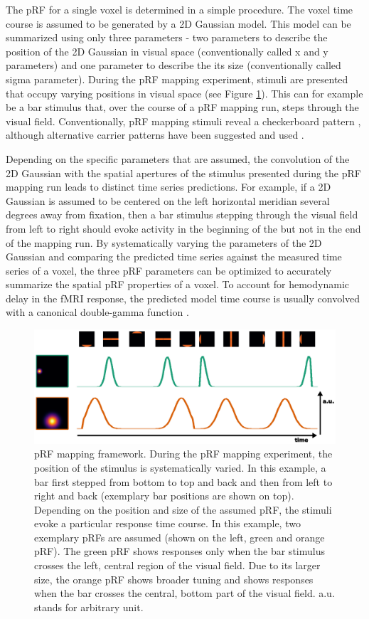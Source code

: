 The pRF for a single voxel is determined in a simple procedure. The voxel time course is assumed to be generated by a 2D Gaussian model. This model can be summarized using only three parameters - two parameters to describe the position of the 2D Gaussian in visual space (conventionally called x and y parameters) and one parameter to describe the its size (conventionally called sigma parameter). During the pRF mapping experiment, stimuli are presented that occupy varying positions in visual space (see Figure \ref{fig:prf}). This can for example be a bar stimulus that, over the course of a pRF mapping run, steps through the visual field. Conventionally, pRF mapping stimuli reveal a checkerboard pattern \parencite{Dumoulin2008}, although alternative carrier patterns have been suggested and used \parencite{Alvarez2015}.

Depending on the specific parameters that are assumed, the convolution of the 2D Gaussian with the spatial apertures of the stimulus presented during the pRF mapping run leads to distinct time series predictions. For example, if a 2D Gaussian is assumed to be centered on the left horizontal meridian several degrees away from fixation, then a bar stimulus stepping through the visual field from left to right should evoke activity in the beginning of the but not in the end of the mapping run. By systematically varying the parameters of the 2D Gaussian and comparing the predicted time series against the measured time series of a voxel, the three pRF parameters can be optimized to accurately summarize the spatial pRF properties of a voxel. To account for hemodynamic delay in the fMRI response, the predicted model time course is usually convolved with a canonical double-gamma function \parencite{Friston1998}.

\begin{figure}[!htbp]
\centering
\includegraphics[width=1.0\textwidth]{figures/chapter_01/fig2.eps}
\caption{pRF mapping framework. During the pRF mapping experiment, the position of the stimulus is systematically varied. In this example, a bar first stepped from bottom to top and back and then from left to right and back (exemplary bar positions are shown on top). Depending on the position and size of the assumed pRF, the stimuli evoke a particular response time course. In this example, two exemplary pRFs are assumed (shown on the left, green and orange pRF). The green pRF shows responses only when the bar stimulus crosses the left, central region of the visual field. Due to its larger size, the orange pRF shows broader tuning and shows responses when the bar crosses the central, bottom part of the visual field. a.u. stands for arbitrary unit.}
\label{fig:prf} 
\end{figure}

